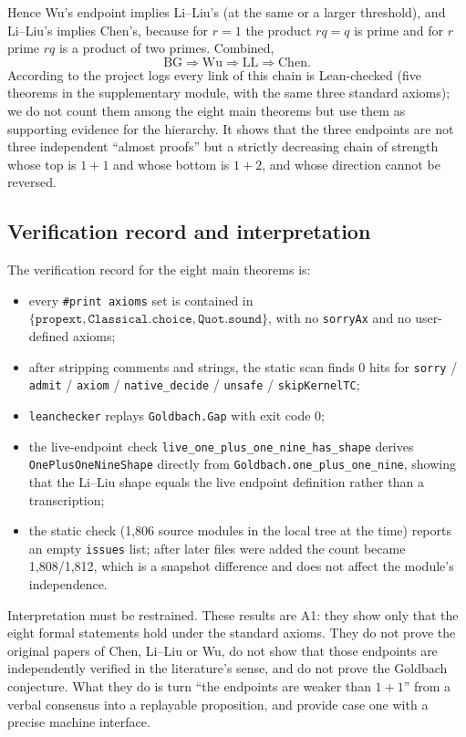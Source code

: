 \documentclass[11pt,a4paper]{article}
\theoremstyle{plain}
\theoremstyle{definition}
\newcommand{\BG}{\mathrm{BG}}
\newcommand{\Chen}{\mathrm{Chen}}
\newcommand{\LL}{\mathrm{LL}}
\newcommand{\WU}{\mathrm{Wu}}
\begin{document}
Hence Wu's endpoint implies Li--Liu's (at the same or a larger threshold), and Li--Liu's implies Chen's, because for $r=1$ the product $rq=q$ is prime and for $r$ prime $rq$ is a product of two primes. Combined,
\[
\BG\Longrightarrow\WU\Longrightarrow\LL\Longrightarrow\Chen.
\]
According to the project logs every link of this chain is Lean-checked (five theorems in the supplementary module, with the same three standard axioms); we do not count them among the eight main theorems but use them as supporting evidence for the hierarchy. It shows that the three endpoints are not three independent ``almost proofs'' but a strictly decreasing chain of strength whose top is $1+1$ and whose bottom is $1+2$, and whose direction cannot be reversed.

\subsection{Verification record and interpretation}
\label{sec:endpoints-verification}

The verification record for the eight main theorems is:

\begin{itemize}
\item every \texttt{\#print axioms} set is contained in $\{\texttt{propext},\texttt{Classical.choice},\texttt{Quot.sound}\}$, with no \texttt{sorryAx} and no user-defined axioms;
\item after stripping comments and strings, the static scan finds 0 hits for \texttt{sorry} / \texttt{admit} / \texttt{axiom} / \texttt{native\_decide} / \texttt{unsafe} / \texttt{skipKernelTC};
\item \texttt{leanchecker} replays \texttt{Goldbach.Gap} with exit code 0;
\item the live-endpoint check \texttt{live\_one\_plus\_one\_nine\_has\_shape} derives \texttt{OnePlusOneNineShape} directly from \texttt{Goldbach.one\_plus\_one\_nine}, showing that the Li--Liu shape equals the live endpoint definition rather than a transcription;
\item the static check (1,806 source modules in the local tree at the time) reports an empty \texttt{issues} list; after later files were added the count became 1,808/1,812, which is a snapshot difference and does not affect the module's independence.
\end{itemize}

Interpretation must be restrained. These results are A1: they show only that the eight formal statements hold under the standard axioms. They do not prove the original papers of Chen, Li--Liu or Wu, do not show that those endpoints are independently verified in the literature's sense, and do not prove the Goldbach conjecture. What they do is turn ``the endpoints are weaker than $1+1$'' from a verbal consensus into a replayable proposition, and provide case one with a precise machine interface.
\end{document}
